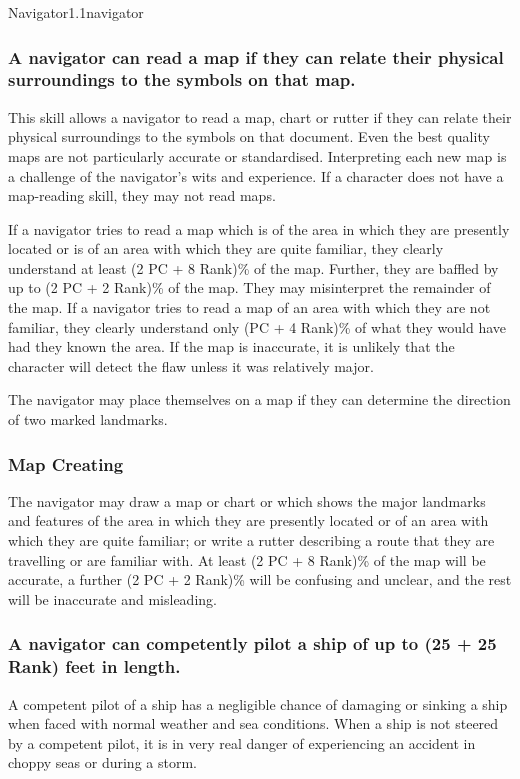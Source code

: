 \begin{skill}{Navigator}{1.1}{navigator}
\subsubsection{A navigator can read a map if they can relate their
physical surroundings to the symbols on that map.}

This skill allows a navigator to read a map, chart or rutter if they
can relate their physical surroundings to the symbols on that
document. Even the best quality maps are not particularly accurate or
standardised. Interpreting each new map is a challenge of the
navigator's wits and experience. If a character does not have a
map-reading skill, they may not read maps.

If a navigator tries to read a map which is of the area in which they
are presently located or is of an area with which they are quite
familiar, they clearly understand at least (2 \x PC + 8 \x Rank)\% of
the map. Further, they are baffled by up to (2 \x PC + 2 \x Rank)\% of
the map. They may misinterpret the remainder of the map. If a
navigator tries to read a map of an area with which they are not
familiar, they clearly understand only (PC + 4 \x Rank)\% of what they
would have had they known the area. If the map is inaccurate, it is
unlikely that the character will detect the flaw unless it was
relatively major.

The navigator may place themselves on a map if they can determine the
direction of two marked landmarks.

\subsubsection{Map Creating}

The navigator may draw a map or chart or which shows the major
landmarks and features of the area in which they are presently located
or of an area with which they are quite familiar; or write a rutter
describing a route that they are travelling or are familiar with. At
least (2 \x PC + 8 \x Rank)\% of the map will be accurate, a further
(2 \x PC + 2 \x Rank)\% will be confusing and unclear, and the rest
will be inaccurate and misleading.


\subsubsection{A navigator can competently pilot a ship of up to
(25 + 25 \x Rank) feet in length.}

A competent pilot of a ship has a negligible chance of damaging or
sinking a ship when faced with normal weather and sea conditions.
When a ship is not steered by a competent pilot, it is in very real
danger of experiencing an accident in choppy seas or during a storm.


\end{skill}
